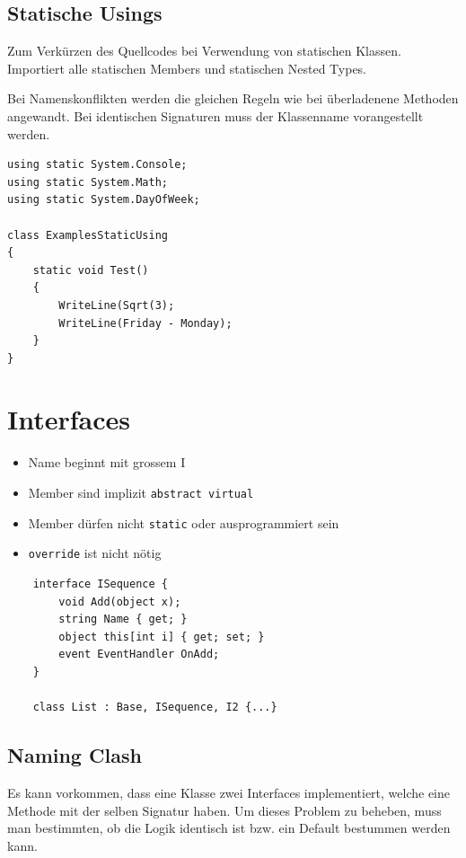 \documentclass[
a4paper,
oneside,
10pt,
fleqn,
headsepline,
toc=listofnumbered, 
bibliography=totocnumbered]{scrartcl}
\let\stdsection\section
\renewcommand\section{\clearpage\stdsection}
\begin{document}
\subsection{Statische Usings}
Zum Verkürzen des Quellcodes bei Verwendung von statischen Klassen. Importiert alle statischen Members und statischen Nested Types.

Bei Namenskonflikten werden die gleichen Regeln wie bei überladenene Methoden angewandt. Bei identischen Signaturen muss der Klassenname vorangestellt werden.

\begin{lstlisting}
using static System.Console;
using static System.Math;
using static System.DayOfWeek;

class ExamplesStaticUsing
{
    static void Test()
    {
        WriteLine(Sqrt(3);
        WriteLine(Friday - Monday);
    }
}
\end{lstlisting}



\section{Interfaces}
\begin{itemize}
	\item Name beginnt mit grossem I	
	\item Member sind implizit \lstinline[language=C]|abstract virtual|
	\item Member dürfen nicht \lstinline|static| oder ausprogrammiert sein 
	\item \lstinline|override| ist nicht nötig
\end{itemize}
\begin{lstlisting}
	interface ISequence {
		void Add(object x);
		string Name { get; }
		object this[int i] { get; set; }
		event EventHandler OnAdd;
	}
	
	class List : Base, ISequence, I2 {...}
\end{lstlisting}

\subsection{Naming Clash}
Es kann vorkommen, dass eine Klasse zwei Interfaces implementiert, welche eine Methode mit der selben Signatur haben. Um dieses Problem zu beheben, muss man bestimmten, ob die Logik identisch ist bzw. ein Default bestummen werden kann.
\end{document}
